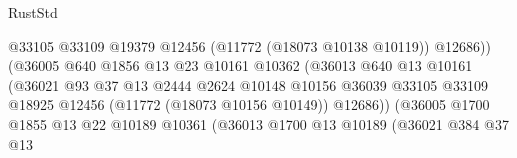 \begin{lexlean}{RustStd}
\begin{coremodule}
                                                @33105
                                                @33109
                                                @19379
                                                @12456
                                                (@11772 (@18073 @10138 @10119))
                                                @12686))
                                            (@36005
                                              @640
                                              @1856
                                              @13
                                              @23
                                              @10161
                                              @10362
                                              (@36013
                                                @640
                                                @13
                                                @10161
                                                (@36021
                                                  @93
                                                  @37
                                                  @13
                                                  @2444
                                                  @2624
                                                  @10148
                                                  @10156
                                                  @36039
                                                  @33105
                                                  @33109
                                                  @18925
                                                  @12456
                                                  (@11772 (@18073 @10156 @10149))
                                                  @12686))
                                              (@36005
                                                @1700
                                                @1855
                                                @13
                                                @22
                                                @10189
                                                @10361
                                                (@36013
                                                  @1700
                                                  @13
                                                  @10189
                                                  (@36021
                                                    @384
                                                    @37
                                                    @13

\end{coremodule}
\end{lexlean}
